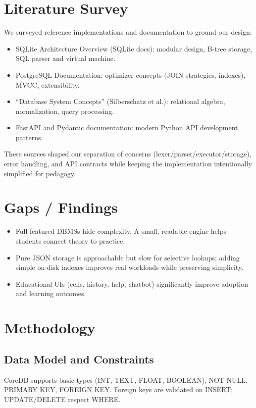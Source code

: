 \documentclass[12pt,a4paper]{article}
\begin{document}
\section{Literature Survey}
We surveyed reference implementations and documentation to ground our design:
\begin{itemize}[leftmargin=*,nosep]
  \item SQLite Architecture Overview (SQLite docs): modular design, B-tree storage, SQL parser and virtual machine.
  \item PostgreSQL Documentation: optimizer concepts (JOIN strategies, indexes), MVCC, extensibility.
  \item ``Database System Concepts'' (Silberschatz et al.): relational algebra, normalization, query processing.
  \item FastAPI and Pydantic documentation: modern Python API development patterns.
\end{itemize}
These sources shaped our separation of concerns (lexer/parser/executor/storage), error handling, and API contracts while keeping the implementation intentionally simplified for pedagogy.

\section{Gaps / Findings}
\begin{itemize}[leftmargin=*,nosep]
  \item Full-featured DBMSs hide complexity. A small, readable engine helps students connect theory to practice.
  \item Pure JSON storage is approachable but slow for selective lookups; adding simple on-disk indexes improves real workloads while preserving simplicity.
  \item Educational UIs (cells, history, help, chatbot) significantly improve adoption and learning outcomes.
\end{itemize}

\section{Methodology}
\subsection{Data Model and Constraints}
CoreDB supports basic types (INT, TEXT, FLOAT, BOOLEAN), NOT NULL, PRIMARY KEY, FOREIGN KEY. Foreign keys are validated on INSERT; UPDATE/DELETE respect WHERE.
\end{document}
